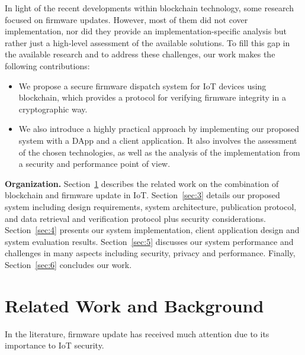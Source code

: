 \documentclass[conference]{IEEEtran}
\begin{document}
In light of the recent developments within blockchain technology, some research focused on firmware updates. However, most of them did not cover implementation, nor did they provide an implementation-specific analysis but rather just a high-level assessment of the available solutions.
To fill this gap in the available research and to address these challenges, our work makes the following contributions:

\begin{itemize}
    \item We propose a secure firmware dispatch system for IoT devices using blockchain, which provides a protocol for verifying firmware integrity in a cryptographic way.
    \item We also introduce a highly practical approach by implementing our proposed system with a DApp and a client application. It also involves the assessment of the chosen technologies, as well as the analysis of the implementation from a security and performance point of view.
\end{itemize}


\textbf{Organization.} Section~\ref{sec:2} describes the related work on the combination of blockchain and firmware update in IoT. Section~\ref{sec:3} details our proposed system including design requirements, system architecture, publication protocol, and data retrieval and verification protocol plus security considerations. Section~\ref{sec:4} presents our system implementation, client application design and system evaluation results. Section~\ref{sec:5} discusses our system performance and challenges in many aspects including security, privacy and performance. Finally, Section~\ref{sec:6} concludes our work.
	
\section{Related Work and Background}\label{sec:2}
In the literature, firmware update has received much attention due to its importance to IoT security.
\end{document}
